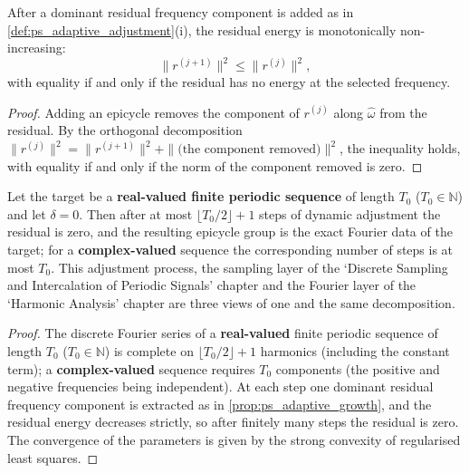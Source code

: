 \begin{proposition}\label{prop:ps_adaptive_growth}
After a dominant residual frequency component is added as in \cref{def:ps_adaptive_adjustment}(i), the residual energy is monotonically non-increasing:
\[
\|r^{(j+1)}\|^2\le\|r^{(j)}\|^2,
\]
with equality if and only if the residual has no energy at the selected frequency.
\end{proposition}

\begin{proof}
Adding an epicycle removes the component of $r^{(j)}$ along $\hat\omega$ from the residual. By the orthogonal decomposition $\|r^{(j)}\|^2=\|r^{(j+1)}\|^2+\|\text{(the component removed)}\|^2$, the inequality holds, with equality if and only if the norm of the component removed is zero.
\end{proof}

\begin{theorem}\label{thm:ps_adaptive_convergence}
Let the target be a \textbf{real-valued finite periodic sequence} of length $T_0$ ($T_0\in\mathbb N$) and let $\delta=0$. Then after at most $\lfloor T_0/2\rfloor+1$ steps of dynamic adjustment the residual is zero, and the resulting epicycle group is the exact Fourier data of the target; for a \textbf{complex-valued} sequence the corresponding number of steps is at most $T_0$. This adjustment process, the sampling layer of the `Discrete Sampling and Intercalation of Periodic Signals' chapter and the Fourier layer of the `Harmonic Analysis' chapter are three views of one and the same decomposition.
\end{theorem}

\begin{proof}
The discrete Fourier series of a \textbf{real-valued} finite periodic sequence of length $T_0$ ($T_0\in\mathbb N$) is complete on $\lfloor T_0/2\rfloor+1$ harmonics (including the constant term); a \textbf{complex-valued} sequence requires $T_0$ components (the positive and negative frequencies being independent). At each step one dominant residual frequency component is extracted as in \cref{prop:ps_adaptive_growth}, and the residual energy decreases strictly, so after finitely many steps the residual is zero. The convergence of the parameters is given by the strong convexity of regularised least squares.
\end{proof}

